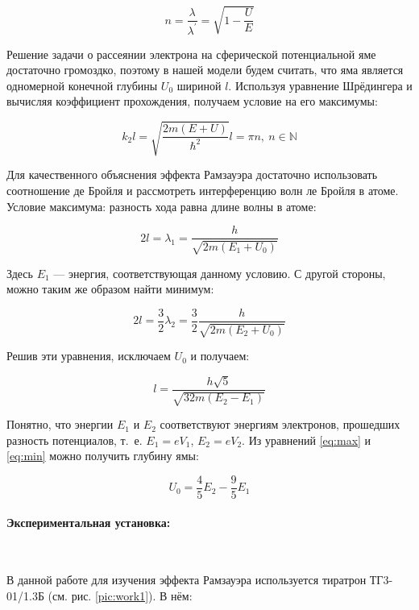 \documentclass[a4paper, 12pt]{article}
\newcommand{\parag}[1]{\paragraph*{#1:}}
\begin{document}
\begin{equation}
    n = \frac{\lambda}{\lambda^\prime} = \sqrt{1 - \frac{U}{E}}
\end{equation}

Решение задачи о рассеянии электрона на сферической потенциальной яме достаточно громоздко, поэтому в нашей модели будем считать, что яма является одномерной конечной глубины $U_0$ шириной $l$. Используя уравнение Шрёдингера и вычисляя коэффициент прохождения, получаем условие на его максимумы:

\begin{equation}
    k_2 l = \sqrt{\frac{2 m (E + U)}{\hbar^2}}l = \pi n, ~ n \in \mathbb{N} 
\end{equation}

Для качественного объяснения эффекта Рамзауэра достаточно использовать соотношение де Бройля и рассмотреть интерференцию волн ле Бройля в атоме. Условие максимума: разность хода равна длине волны в атоме:

\begin{equation}
    2l = \lambda_1 = \frac{h}{\sqrt{2 m (E_1 + U_0)}}
    \label{eq:max}
\end{equation}

Здесь $E_1$ --- энергия, соответствующая данному условию. С другой стороны, можно таким же образом найти минимум:

\begin{equation}
    2l = \frac{3}{2} \lambda_2 = \frac{3}{2} \frac{h}{\sqrt{2 m (E_2 + U_0)}}
    \label{eq:min}
\end{equation}

Решив эти уравнения, исключаем $U_0$ и получаем:

\begin{equation}
    l = \frac{h \sqrt{5}}{\sqrt{32 m (E_2 - E_1)}}
    \label{eq:without_U}
\end{equation}

Понятно, что энергии $E_1$ и $E_2$ соответствуют энергиям электронов, прошедших разность потенциалов, т.~е. $E_1 = e V_1$, $E_2 = e V_2$. Из уравнений \eqref{eq:max} и \eqref{eq:min} можно получить глубину ямы:

\begin{equation}
    U_0 = \frac{4}{5} E_2 - \frac{9}{5} E_1
    \label{eq:U}
\end{equation}

\parag {Экспериментальная установка} ~

В данной работе для изучения эффекта Рамзауэра используется тиратрон ТГ3-01/1.3Б (см. рис. \ref{pic:work1}). В нём:
\end{document}
